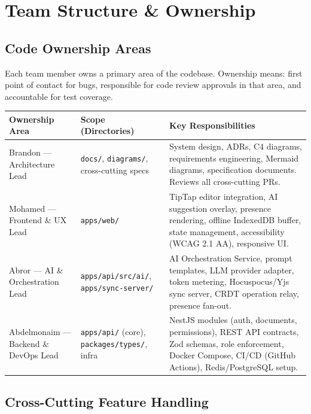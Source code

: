 \documentclass[10pt, a4paper]{article}
\begin{document}

\section{Team Structure \& Ownership}

\subsection{Code Ownership Areas}

Each team member owns a primary area of the codebase. Ownership means: first point of contact for bugs, responsible for code review approvals in that area, and accountable for test coverage.

{\small
\begin{tabularx}{\textwidth}{@{}lXX@{}}
\toprule
\textsf{\textbf{Ownership Area}} & \textsf{\textbf{Scope (Directories)}} & \textsf{\textbf{Key Responsibilities}} \\
\midrule
Brandon --- Architecture Lead & \texttt{docs/}, \texttt{diagrams/}, cross-cutting specs & System design, ADRs, C4 diagrams, requirements engineering, Mermaid diagrams, specification documents. Reviews all cross-cutting PRs. \\
\addlinespace[3pt]
Mohamed --- Frontend \& UX Lead & \texttt{apps/web/} & TipTap editor integration, AI suggestion overlay, presence rendering, offline IndexedDB buffer, state management, accessibility (WCAG 2.1 AA), responsive UI. \\
\addlinespace[3pt]
Abror --- AI \& Orchestration Lead & \texttt{apps/api/src/ai/}, \texttt{apps/sync-server/} & AI Orchestration Service, prompt templates, LLM provider adapter, token metering, Hocuspocus/Yjs sync server, CRDT operation relay, presence fan-out. \\
\addlinespace[3pt]
Abdelmonaim --- Backend \& DevOps Lead & \texttt{apps/api/} (core), \texttt{packages/types/}, infra & NestJS modules (auth, documents, permissions), REST API contracts, Zod schemas, role enforcement, Docker Compose, CI/CD (GitHub Actions), Redis/PostgreSQL setup. \\
\bottomrule
\end{tabularx}
}

\subsection{Cross-Cutting Feature Handling}
\end{document}
